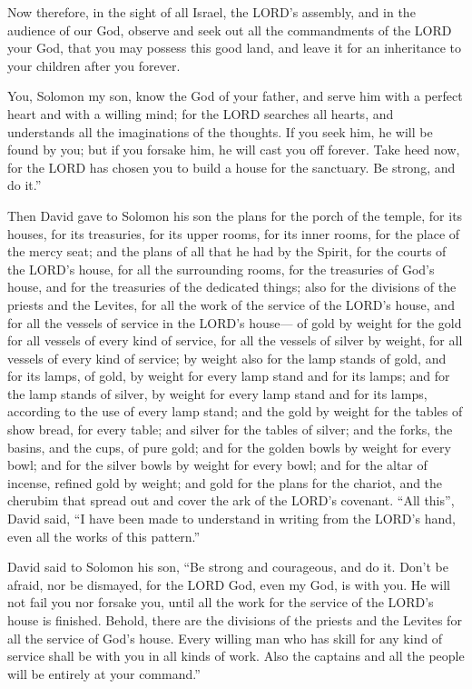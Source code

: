  Now therefore, in the sight of all Israel, the LORD's
assembly, and in the audience of our God, observe and seek out all the
commandments of the LORD your God, that you may possess this good land,
and leave it for an inheritance to your children after you forever.

 You, Solomon my son, know the God of your father, and serve
him with a perfect heart and with a willing mind; for the LORD searches
all hearts, and understands all the imaginations of the thoughts. If you
seek him, he will be found by you; but if you forsake him, he will cast
you off forever.  Take heed now, for the LORD has chosen
you to build a house for the sanctuary. Be strong, and do it.''

 Then David gave to Solomon his son the plans for the porch
of the temple, for its houses, for its treasuries, for its upper rooms,
for its inner rooms, for the place of the mercy seat;  and
the plans of all that he had by the Spirit, for the courts of the LORD's
house, for all the surrounding rooms, for the treasuries of God's house,
and for the treasuries of the dedicated things;  also for
the divisions of the priests and the Levites, for all the work of the
service of the LORD's house, and for all the vessels of service in the
LORD's house---  of gold by weight for the gold for all
vessels of every kind of service, for all the vessels of silver by
weight, for all vessels of every kind of service;  by
weight also for the lamp stands of gold, and for its lamps, of gold, by
weight for every lamp stand and for its lamps; and for the lamp stands
of silver, by weight for every lamp stand and for its lamps, according
to the use of every lamp stand;  and the gold by weight for
the tables of show bread, for every table; and silver for the tables of
silver;  and the forks, the basins, and the cups, of pure
gold; and for the golden bowls by weight for every bowl; and for the
silver bowls by weight for every bowl;  and for the altar
of incense, refined gold by weight; and gold for the plans for the
chariot, and the cherubim that spread out and cover the ark of the
LORD's covenant.  ``All this'', David said, ``I have been
made to understand in writing from the LORD's hand, even all the works
of this pattern.''

 David said to Solomon his son, ``Be strong and courageous,
and do it. Don't be afraid, nor be dismayed, for the LORD God, even my
God, is with you. He will not fail you nor forsake you, until all the
work for the service of the LORD's house is finished. 
Behold, there are the divisions of the priests and the Levites for all
the service of God's house. Every willing man who has skill for any kind
of service shall be with you in all kinds of work. Also the captains and
all the people will be entirely at your command.''

